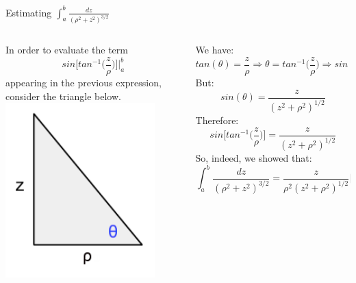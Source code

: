 \begin{frame}{Estimating $\int_{a}^{b} \frac{dz}{({\rho}^2+z^2)^{3/2}}$}

\begin{columns}
  \begin{column}{0.30\textwidth}
    {\small
     In order to evaluate the term
     \begin{equation*}
       sin\Big[ tan^{-1}\Big(\frac{z}{\rho}\Big) \Big] \biggr\rvert_{a}^{b}
     \end{equation*}
     appearing in the previous expression,
     consider the triangle below.\\
    }
    \includegraphics[width=0.85\textwidth]{./images/schematics/triangle_for_integral_in_wire_magnetic_field_calc.png}
  \end{column}
  \begin{column}{0.70\textwidth}
  {\small
    We have:
    \begin{equation*}
      tan(\theta) = \frac{z}{{\rho}} \Rightarrow
      \theta = tan^{-1}\Big( \frac{z}{{\rho}} \Big)  \Rightarrow
      sin(\theta) = sin\Big[ tan^{-1}\Big( \frac{z}{{\rho}} \Big) \Big]
    \end{equation*}
    But:
    \begin{equation*}
      sin(\theta) = \frac{z}{(z^2+{\rho}^2)^{1/2}}
    \end{equation*}
    Therefore:
    \begin{equation*}
       sin\Big[ tan^{-1}\Big( \frac{z}{{\rho}} \Big) \Big] = \frac{z}{(z^2+{\rho}^2)^{1/2}}
    \end{equation*}
    So, indeed, we showed that:
    \begin{equation*}
      \int_{a}^{b} \frac{dz}{({\rho}^2+z^2)^{3/2}} = \frac{z}{{\rho}^{2}(z^{2}+{{\rho}^{2}})^{1/2}} \biggr\rvert_{a}^{b}
    \end{equation*}
  }
  \end{column}
\end{columns}

\end{frame}

